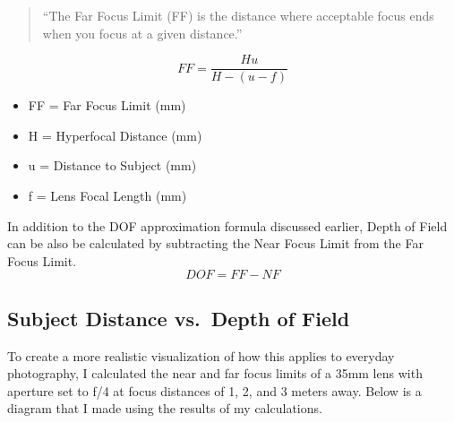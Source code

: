 \documentclass[10pt]{article}
\providecommand{\tightlist}{%
      \setlength{\itemsep}{0pt}\setlength{\parskip}{0pt}}
\begin{document}
\begin{quote}
``The Far Focus Limit (FF) is the distance where acceptable focus ends
when you focus at a given distance.''
\end{quote}

\[
    FF = \frac{Hu}{H-(u-f)}
\]

\begin{itemize}
\tightlist
\item
  FF = Far Focus Limit (mm)
\item
  H = Hyperfocal Distance (mm)
\item
  u = Distance to Subject (mm)
\item
  f = Lens Focal Length (mm)
\end{itemize}

In addition to the DOF approximation formula discussed earlier, Depth of
Field can be also be calculated by subtracting the Near Focus Limit from
the Far Focus Limit. \[
    DOF = FF-NF
\]

    \subsection{Subject Distance vs.~Depth of
Field}\label{subject-distance-vs.-depth-of-field}

To create a more realistic visualization of how this applies to everyday
photography, I calculated the near and far focus limits of a 35mm lens
with aperture set to f/4 at focus distances of 1, 2, and 3 meters away.
Below is a diagram that I made using the results of my calculations.
\end{document}
